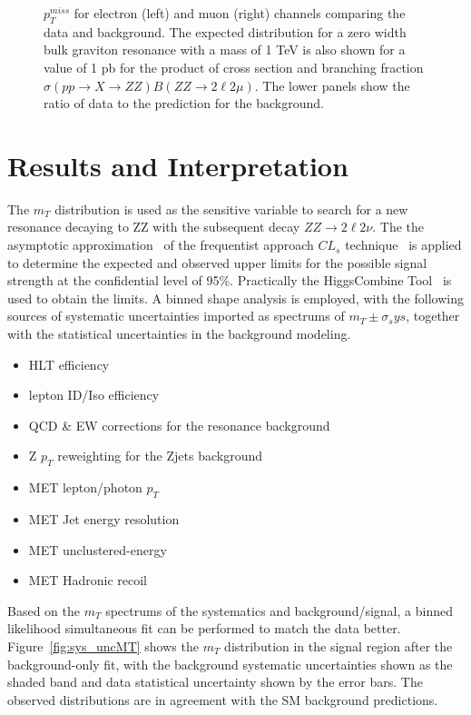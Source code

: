 \begin{figure}[htbp]
\begin{center}
\caption{$p_T ^{miss}$ for electron (left) and muon (right) channels comparing the data and background. The expected distribution for a zero width bulk graviton resonance with a mass of 1 TeV is also shown for a value of 1 pb for the product of cross section and branching fraction $\sigma(pp\rightarrow X\rightarrow ZZ)B(ZZ\rightarrow 2\ell 2\mu)$. The lower panels show the ratio of data to the prediction for the background. }
\label{fig:sys_uncMET}
\end{center}
\end{figure}


\section{Results and Interpretation}
The $m_T$ distribution is used as the sensitive variable to search for a new resonance decaying to ZZ with the subsequent decay $ZZ\rightarrow 2\ell 2\nu$. The the asymptotic approximation~\cite{sys_cls0} of the frequentist approach $CL_s$ technique~\cite{sys_cls1,sys_cls2,sys_cls3} is applied to determine the expected and observed upper limits for the possible signal strength at the confidential level of 95\%. Practically the HiggsCombine Tool~\cite{sys_higgscombinetool} is used to obtain the limits. A binned shape analysis is employed, with the following sources of systematic uncertainties imported as spectrums of $m_T\pm \sigma_sys$, together with the statistical uncertainties in the background modeling.
\begin{itemize}
\item HLT efficiency
\item lepton ID/Iso efficiency
\item QCD & EW corrections for the resonance background
\item Z $p_T$ reweighting for the Zjets background
\item MET lepton/photon $p_T$
\item MET Jet energy resolution
\item MET unclustered-energy
\item MET Hadronic recoil 
\end{itemize}

Based on the $m_T$ spectrums of the systematics and background/signal, a binned likelihood simultaneous fit can be performed to match the data better. Figure~\ref{fig:sys_uncMT} shows the $m_T$ distribution in the signal region after the background-only fit, with the background systematic uncertainties shown as the shaded band and data statistical uncertainty shown by the error bars. The observed distributions are in agreement with the SM background predictions.

